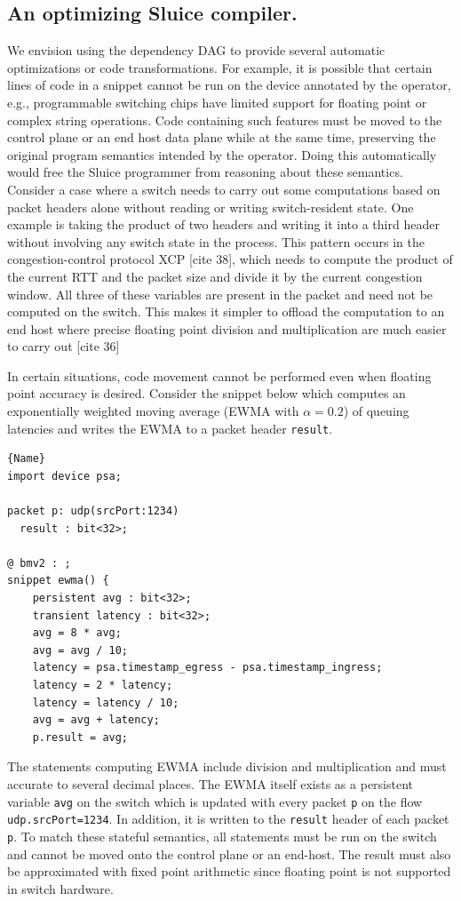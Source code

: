 \documentclass[12pt, oneside]{article}
\begin{document}
\subsection{An optimizing Sluice compiler.} We envision using the dependency DAG to
provide several automatic optimizations or code transformations. For example,
it is possible that certain lines of code in a snippet cannot be run on the
device annotated by the operator, e.g., programmable switching chips have
limited support for floating point or complex string operations. Code
containing such features must be moved to the control plane or an end host data
plane while at the same time, preserving the original program semantics
intended by the operator. Doing this automatically would free the Sluice
programmer from reasoning about these semantics. Consider a case where a switch needs to carry out some computations based on packet headers alone without reading or writing switch-resident state. One example is taking the product of two headers and writing it into a third header without involving any switch state in the process. This pattern occurs in the congestion-control protocol XCP [cite 38], which needs to compute the product of the current RTT and the packet size and divide it by the current congestion window. All three of these variables are present in the packet and need not be computed on the switch. This makes it simpler to offload the computation to an end host where precise floating point division and multiplication are much easier to carry out [cite 36]

In certain situations, code movement cannot be performed even when floating point accuracy is desired. Consider the snippet below which computes an exponentially weighted moving average (EWMA with $\alpha=0.2$) of queuing latencies and writes the EWMA to a packet header \texttt{result}. 

\begin{lstlisting}[frame=tlrb, basicstyle=\linespread{1.3}\scriptsize]{Name}
import device psa;

packet p: udp(srcPort:1234)
  result : bit<32>;

@ bmv2 : ;
snippet ewma() {
    persistent avg : bit<32>;
    transient latency : bit<32>;
    avg = 8 * avg;
    avg = avg / 10;
    latency = psa.timestamp_egress - psa.timestamp_ingress;
    latency = 2 * latency;
    latency = latency / 10;
    avg = avg + latency;
    p.result = avg;
\end{lstlisting}

The statements computing EWMA include division and multiplication and must accurate to several decimal places. The EWMA itself exists as a persistent variable \texttt{avg} on the switch which is updated with every packet \texttt{p} on the flow \texttt{udp.srcPort=1234}. In addition, it is written to the \texttt{result} header of each packet \texttt{p}. To match these stateful semantics, all statements must be run on the switch and cannot be moved onto the control plane or an end-host. The result must also be approximated with fixed point arithmetic since floating point is not supported in switch hardware. 
\end{document}
